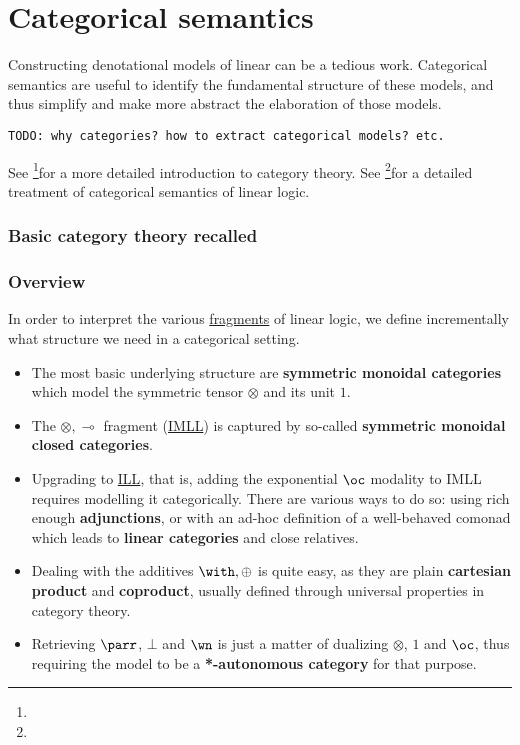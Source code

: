\chapter{Categorical semantics}\label{categorical-semantics}

Constructing denotational models of linear can be a tedious work.
Categorical semantics are useful to identify the fundamental structure
of these models, and thus simplify and make more abstract the
elaboration of those models.

\texttt{TODO:~why~categories?~how~to~extract~categorical~models?~etc.}

See \footnote{}for a more detailed introduction to category theory. See
\footnote{}for a detailed treatment of categorical semantics of linear
logic.

\subsection{Basic category theory recalled}\label{basic-category-theory-recalled}

\subsection{Overview}\label{overview}

In order to interpret the various \href{fragment}{fragments} of linear
logic, we define incrementally what structure we need in a categorical
setting.

\begin{itemize}
\tightlist
\item
  The most basic underlying structure are \textbf{symmetric monoidal
  categories} which model the symmetric tensor \(\otimes\) and its unit
  \(1\).
\item
  The \(\otimes, \multimap\) fragment (\url{IMLL}) is captured by
  so-called \textbf{symmetric monoidal closed categories}.
\item
  Upgrading to \url{ILL}, that is, adding the exponential \(\oc\)
  modality to IMLL requires modelling it categorically. There are
  various ways to do so: using rich enough \textbf{adjunctions}, or with
  an ad-hoc definition of a well-behaved comonad which leads to
  \textbf{linear categories} and close relatives.
\item
  Dealing with the additives \(\with, \oplus\) is quite easy, as they
  are plain \textbf{cartesian product} and \textbf{coproduct}, usually
  defined through universal properties in category theory.
\item
  Retrieving \(\parr\), \(\bot\) and \(\wn\) is just a matter of
  dualizing \(\otimes\), \(1\) and \(\oc\), thus requiring the model to
  be a \textbf{*-autonomous category} for that purpose.
\end{itemize}

